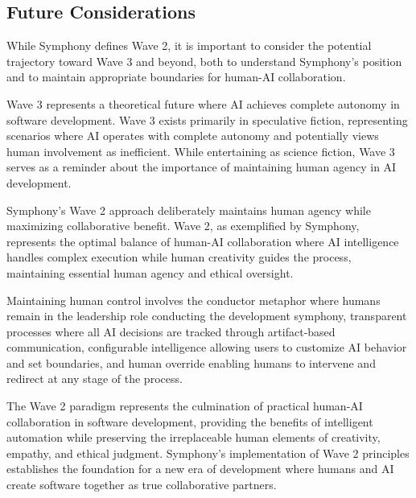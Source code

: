 \subsection{Future Considerations}

While Symphony defines Wave 2, it is important to consider the potential trajectory toward Wave 3 and beyond, both to understand Symphony's position and to maintain appropriate boundaries for human-AI collaboration.

Wave 3 represents a theoretical future where AI achieves complete autonomy in software development. Wave 3 exists primarily in speculative fiction, representing scenarios where AI operates with complete autonomy and potentially views human involvement as inefficient. While entertaining as science fiction, Wave 3 serves as a reminder about the importance of maintaining human agency in AI development.

Symphony's Wave 2 approach deliberately maintains human agency while maximizing collaborative benefit. Wave 2, as exemplified by Symphony, represents the optimal balance of human-AI collaboration where AI intelligence handles complex execution while human creativity guides the process, maintaining essential human agency and ethical oversight.

Maintaining human control involves the conductor metaphor where humans remain in the leadership role conducting the development symphony, transparent processes where all AI decisions are tracked through artifact-based communication, configurable intelligence allowing users to customize AI behavior and set boundaries, and human override enabling humans to intervene and redirect at any stage of the process.

The Wave 2 paradigm represents the culmination of practical human-AI collaboration in software development, providing the benefits of intelligent automation while preserving the irreplaceable human elements of creativity, empathy, and ethical judgment. Symphony's implementation of Wave 2 principles establishes the foundation for a new era of development where humans and AI create software together as true collaborative partners.
